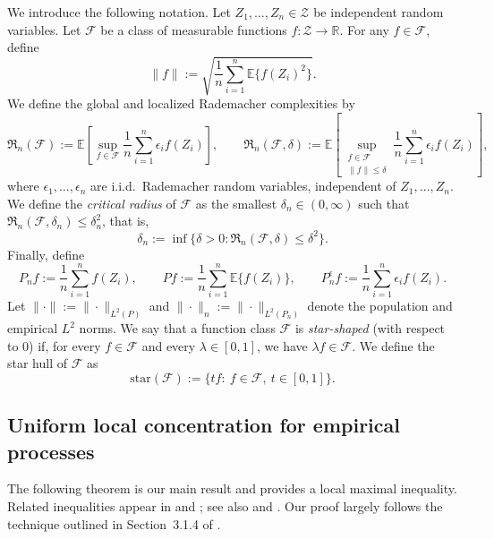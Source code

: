 \documentclass[11pt]{article}
\theoremstyle{plain}
\theoremstyle{definition} %
\begin{document}
We introduce the following notation. Let $Z_1,\ldots,Z_n \in \mathcal{Z}$ be independent random variables. Let $\mathcal F$ be a class of measurable functions $f:\mathcal Z\to\mathbb R$.
For any $f\in\mathcal{F}$, define
\[
\|f\| := \sqrt{\frac{1}{n} \sum_{i=1}^n \mathbb{E}\{f(Z_i)^2\}}.
\]
We define the global and localized Rademacher complexities by
\[
\mathfrak{R}_n(\mathcal{F})
:=
\mathbb{E}\left[
\sup_{f \in \mathcal{F}}
\frac{1}{n} \sum_{i=1}^n \epsilon_i f(Z_i)\right],
\qquad
\mathfrak{R}_n(\mathcal{F},\delta)
:=
\mathbb{E}\left[
\sup_{\substack{f \in \mathcal{F} \\ \|f\| \le \delta}}
\frac{1}{n} \sum_{i=1}^n \epsilon_i f(Z_i)
\right],
\]
where $\epsilon_1,\ldots,\epsilon_n$ are i.i.d.\ Rademacher random variables, independent of $Z_1,\ldots,Z_n$.
We define the \emph{critical radius} of $\mathcal{F}$ as the smallest $\delta_n\in(0,\infty)$ such that $\mathfrak{R}_n(\mathcal{F},\delta_n) \le \delta_n^2$, that is,
\[
\delta_n := \inf \bigl\{\delta>0 : \mathfrak{R}_n(\mathcal{F},\delta) \le \delta^2 \bigr\}.
\]
Finally, define
\[
P_n f := \frac{1}{n}\sum_{i=1}^n f(Z_i),
\qquad
Pf := \frac{1}{n}\sum_{i=1}^n \mathbb{E}\{f(Z_i)\},
\qquad
P_n^\epsilon f := \frac{1}{n}\sum_{i=1}^n \epsilon_i f(Z_i).
\]
Let $\|\cdot\| := \|\cdot\|_{L^2(P)}$ and $\|\cdot\|_n := \|\cdot\|_{L^2(P_n)}$ denote the population and empirical $L^2$ norms. We say that a function class $\mathcal{F}$ is \emph{star-shaped} (with respect to $0$) if, for every $f\in\mathcal{F}$ and every $\lambda\in[0,1]$, we have $\lambda f \in \mathcal{F}$. We define the star hull of $\mathcal{F}$ as
\[
\mathrm{star}(\mathcal F):=\{t f:\ f\in\mathcal F,\ t\in[0,1]\}.
\]



 





\subsection{Uniform local concentration for empirical processes}

The following theorem is our main result and provides a local maximal inequality.
Related inequalities appear in \citet{bartlett2005local} and \citet{wainwright2019high};
see also \citet[Appendix~K, Lemmas~11--14]{foster2023orthogonal} and
\citet[Lemma~11]{van2025nonparametric}. Our proof largely follows the technique
outlined in Section~3.1.4 of \citet{bartlett2005local}.
\end{document}
